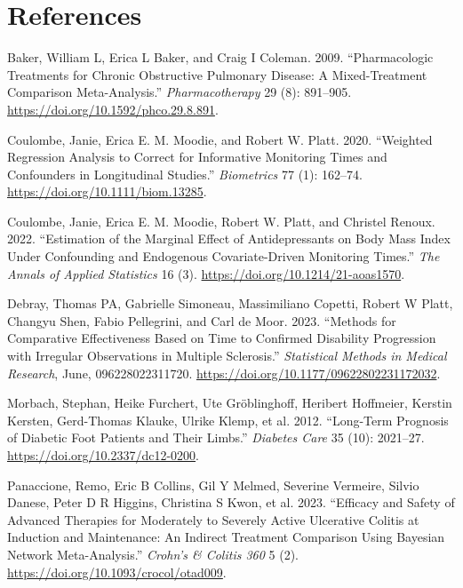 \documentclass[
  letterpaper,
  DIV=11,
  numbers=noendperiod]{scrreprt}
\newlength{\cslhangindent}
\newlength{\cslentryspacingunit} %
\newenvironment{CSLReferences}[2] %
 {%
  \setlength{\parindent}{0pt}
  \ifodd #1
  \let\oldpar\par
  \def\par{\hangindent=\cslhangindent\oldpar}
  \fi
  \setlength{\parskip}{#2\cslentryspacingunit}
 }%
 {}
\begin{document}
\hypertarget{references-6}{%
\section*{References}\label{references-6}}


\hypertarget{refs}{}
\begin{CSLReferences}{1}{0}
\leavevmode{}%
Baker, William L, Erica L Baker, and Craig I Coleman. 2009.
{``Pharmacologic Treatments for Chronic Obstructive Pulmonary Disease: A
Mixed-Treatment Comparison Meta-Analysis.''} \emph{Pharmacotherapy} 29
(8): 891--905. \url{https://doi.org/10.1592/phco.29.8.891}.

\leavevmode{}%
Coulombe, Janie, Erica E. M. Moodie, and Robert W. Platt. 2020.
{``Weighted Regression Analysis to Correct for Informative Monitoring
Times and Confounders in Longitudinal Studies.''} \emph{Biometrics} 77
(1): 162--74. \url{https://doi.org/10.1111/biom.13285}.

\leavevmode{}%
Coulombe, Janie, Erica E. M. Moodie, Robert W. Platt, and Christel
Renoux. 2022. {``Estimation of the Marginal Effect of Antidepressants on
Body Mass Index Under Confounding and Endogenous Covariate-Driven
Monitoring Times.''} \emph{The Annals of Applied Statistics} 16 (3).
\url{https://doi.org/10.1214/21-aoas1570}.

\leavevmode{}%
Debray, Thomas PA, Gabrielle Simoneau, Massimiliano Copetti, Robert W
Platt, Changyu Shen, Fabio Pellegrini, and Carl de Moor. 2023.
{``Methods for Comparative Effectiveness Based on Time to Confirmed
Disability Progression with Irregular Observations in Multiple
Sclerosis.''} \emph{Statistical Methods in Medical Research}, June,
096228022311720. \url{https://doi.org/10.1177/09622802231172032}.

\leavevmode{}%
Morbach, Stephan, Heike Furchert, Ute Gröblinghoff, Heribert Hoffmeier,
Kerstin Kersten, Gerd-Thomas Klauke, Ulrike Klemp, et al. 2012.
{``Long-{Term Prognosis} of {Diabetic Foot Patients} and {Their
Limbs}.''} \emph{Diabetes Care} 35 (10): 2021--27.
\url{https://doi.org/10.2337/dc12-0200}.

\leavevmode{}%
Panaccione, Remo, Eric B Collins, Gil Y Melmed, Severine Vermeire,
Silvio Danese, Peter D R Higgins, Christina S Kwon, et al. 2023.
{``Efficacy and Safety of Advanced Therapies for Moderately to Severely
Active Ulcerative Colitis at Induction and Maintenance: An Indirect
Treatment Comparison Using Bayesian Network Meta-Analysis.''}
\emph{Crohn's \& Colitis 360} 5 (2).
\url{https://doi.org/10.1093/crocol/otad009}.


\end{CSLReferences}
\end{document}
